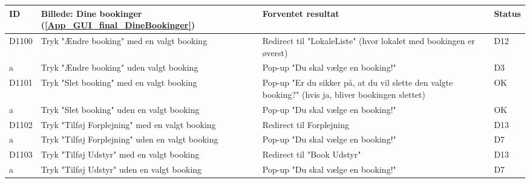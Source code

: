 \begin{tabular}{ |p{0.85cm}| p{5.5cm} | p{8.65cm} | p{1cm} | }
\hline
\textbf{ID} &\textbf{Billede: Dine bookinger} (\ref{App_GUI_final_DineBookinger})  &\textbf{Forventet resultat} & \textbf{Status}\\ 
\hline
D1100 & Tryk "Ændre booking" med en valgt booking & Redirect til "LokaleListe" (hvor lokalet med bookingen er øverst) & D12 \\
\hline
a & Tryk "Ændre booking" uden valgt booking & Pop-up "Du skal vælge en booking!" & D3 \\
\hline
D1101 & Tryk "Slet booking" med en valgt booking & Pop-up "Er du sikker på, at du vil slette den valgte booking?" (hvis ja, bliver bookingen slettet) & OK \\
\hline
a & Tryk "Slet booking" uden en valgt booking & Pop-up "Du skal vælge en booking!" & OK \\
\hline
D1102 & Tryk "Tilføj Forplejning" med en valgt booking & Redirect til Forplejning & D13 \\
\hline
a &  Tryk "Tilføj Forplejning" uden en valgt booking & Pop-up "Du skal vælge en booking!" & D7 \\
\hline
D1103 & Tryk "Tilføj Udstyr" med en valgt booking & Redirect til "Book Udstyr" & D13 \\
\hline
a & Tryk "Tilføj Udstyr" uden en valgt booking & Pop-up "Du skal vælge en booking!" & D7 \\
\hline
\end{tabular}